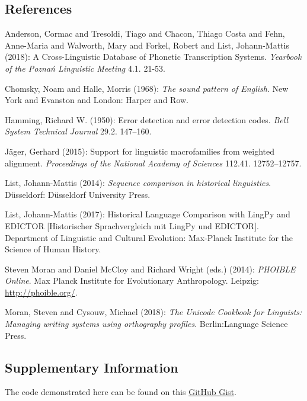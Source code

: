 \documentclass[
  a4paper,
  14pt,
  oneside,
  tablecaptionabove
]{scrbook}
\begin{document}
\subsection*{References}

\nopagebreak\hangindent=0.7cm {\small  Anderson, Cormac and Tresoldi, Tiago and Chacon, Thiago Costa and
Fehn, Anne-Maria and Walworth, Mary and Forkel, Robert and List,
Johann-Mattis (2018): A Cross-Linguistic Database of Phonetic
Transcription Systems. \emph{Yearbook of the Poznań Linguistic Meeting}
4.1. 21-53. }

\nopagebreak\hangindent=0.7cm {\small  Chomsky, Noam and Halle, Morris (1968): \emph{The sound pattern of
English}. New York and Evanston and London: Harper and Row.}

\nopagebreak\hangindent=0.7cm {\small  Hamming, Richard W. (1950): Error detection and error detection
codes. \emph{Bell System Technical Journal} 29.2. 147--160.}

\nopagebreak\hangindent=0.7cm {\small  Jäger, Gerhard (2015): Support for linguistic macrofamilies from
weighted alignment. \emph{Proceedings of the National Academy of
Sciences} 112.41. 12752--12757. }

\nopagebreak\hangindent=0.7cm {\small  List, Johann-Mattis (2014): \emph{Sequence comparison in historical
linguistics}. Düsseldorf: Düsseldorf University Press.}

\nopagebreak\hangindent=0.7cm {\small  List, Johann-Mattis (2017): Historical Language Comparison with
LingPy and EDICTOR {[}Historischer Sprachvergleich mit LingPy und
EDICTOR{]}. Department of Linguistic and Cultural Evolution: Max-Planck
Institute for the Science of Human History. }

\nopagebreak\hangindent=0.7cm {\small  Steven Moran and Daniel McCloy and Richard Wright (eds.) (2014):
\emph{PHOIBLE Online}. Max Planck Institute for Evolutionary Anthropology.
Leipzig: \href{//phoible.org/”}{http://phoible.org/}.}

\nopagebreak\hangindent=0.7cm {\small  Moran, Steven and Cysouw, Michael (2018): \emph{The Unicode Cookbook for
Linguists: Managing writing systems using orthography profiles}.
Berlin:Language Science Press. }

\subsection*{Supplementary Information}

The code demonstrated here can be found on this
\href{https://gist.github.com/LinguList/7fac44813572f65259c872ef89fa64ad}{GitHub
Gist}.
\end{document}
